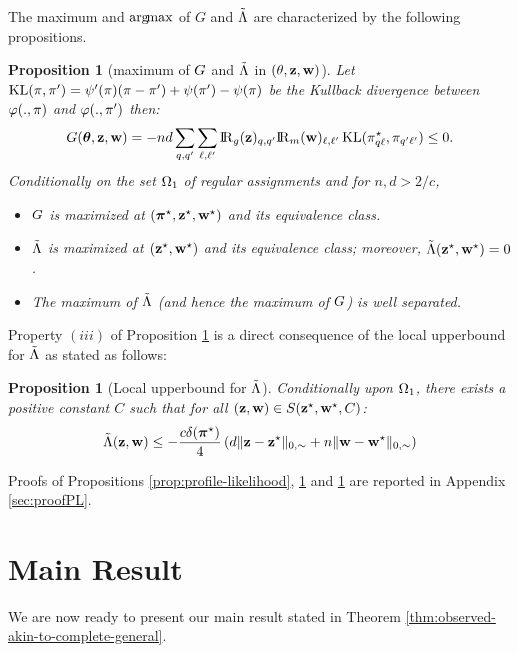 \documentclass[]{imsart}
\newcommand{\1}{\mathds{1}}
\numberwithin{equation}{section}
\theoremstyle{plain}
\newtheorem{proposition}[thm]{Proposition}
\theoremstyle{remark}
\begin{document}
The maximum and $\operatorname*{arg\!max}$ of $G$ and $\tilde{\Lambda}$ are characterized by the following propositions.
\begin{proposition}[maximum of $G$ and $\tilde{\Lambda}$ in $(\theta,\mathbf{z},\mathbf{w})$]
  \label{prop:maximum-conditional-likelihood}
  Let $\operatorname{KL}(\pi,\pi') = \psi'(\pi) (\pi - \pi') + \psi(\pi') - \psi(\pi)$ be the Kullback divergence between $\varphi(., \pi)$ and $\varphi(., \pi')$ then:
  \begin{equation}
    \label{eq:conditional-likelihood-second-form}
    \G(\btheta, \bz, \bw) = - \n\dd \sum_{\kk,\kp} \sum_{\el,\lp} \Rgbz_{\kk,\kp} \Rmbw_{\el, \lp} \KL(\al^\vrai_{\kk\el}, \al_{\kp\lp}) \leq 0.
  \end{equation}
  Conditionally on the set $\Omega_1$ of regular assignments and for $n, d > 2/c$,
\begin{itemize}
\item[(i)] $G$ is maximized at $(\boldsymbol{\pi}^\star, \mathbf{z}^\star, \mathbf{w}^\star)$ and its equivalence class.
\item[(ii)] $\tilde{\Lambda}$ is maximized at $(\mathbf{z}^\star, \mathbf{w}^\star)$ and its equivalence class; moreover, $\tilde{\Lambda}(\mathbf{z}^\star, \mathbf{w}^\star)=0$.
\item[(iii)] The maximum of $\tilde{\Lambda}$ (and hence the maximum of $G$) is well separated.
\end{itemize}

\end{proposition}
Property $(iii)$ of Proposition \ref{prop:maximum-conditional-likelihood} is a direct consequence of the local upperbound for $\tilde{\Lambda}$ as stated as follows:

\begin{proposition}[Local upperbound for  $\tilde{\Lambda}$]
\label{prop:profile-likelihood-derivative}
Conditionally upon $\Omega_1$, there exists a positive constant $C$ such that for all $(\mathbf{z}, \mathbf{w}) \in S(\mathbf{z}^\star, \mathbf{w}^\star, C)$:
\begin{equation}
\label{eq:conditional-likelihood-separability}
  \Lambtilde(\bz, \bw) \leq -\frac{c\delta(\bals)}{4} \left( \dd \|\bz - \bzs\|_{0, \sim} + \n \|\bw - \bws\|_{0,\sim} \right)
\end{equation}
\end{proposition}
Proofs of Propositions \ref{prop:profile-likelihood}, \ref{prop:maximum-conditional-likelihood} and \ref{prop:profile-likelihood-derivative} are reported in Appendix \ref{sec:proofPL}.

\section{Main Result}
\label{sec:big-theorem}
We are now ready to present our main result
stated in Theorem \ref{thm:observed-akin-to-complete-general}.
\end{document}
